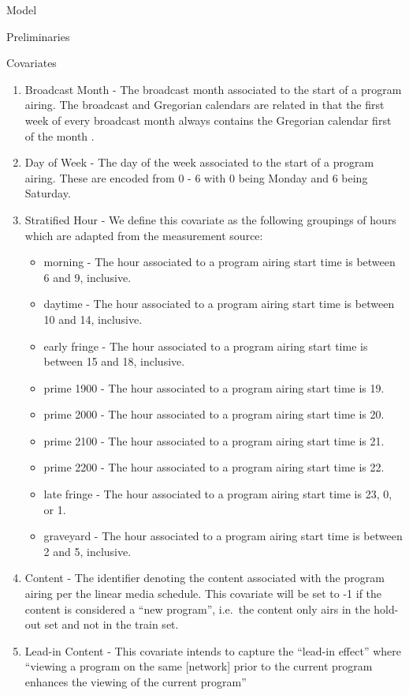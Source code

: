 \begin{chapter}{Model}
\begin{section}{Preliminaries}
\begin{subsection}{Covariates}
    \begin{enumerate}
    \item Broadcast Month - The broadcast month associated to the start of a program airing.
      The broadcast and Gregorian calendars are related in that the first week of every broadcast month always contains the Gregorian calendar first of the month \cite{calendar}.
    \item Day of Week - The day of the week associated to the start of a program airing.
      These are encoded from 0 - 6 with 0 being Monday and 6 being Saturday.
    \item Stratified Hour - We define this covariate as the following groupings of hours which are adapted from the measurement source:
      \begin{itemize}
        \item morning - The hour associated to a program airing start time is between 6 and 9, inclusive.
        \item daytime - The hour associated to a program airing start time is between 10 and 14, inclusive.
        \item early fringe - The hour associated to a program airing start time is between 15 and 18, inclusive.
        \item prime 1900 - The hour associated to a program airing start time is 19.
        \item prime 2000 - The hour associated to a program airing start time is 20.
        \item prime 2100 - The hour associated to a program airing start time is 21.
        \item prime 2200 - The hour associated to a program airing start time is 22.
        \item late fringe - The hour associated to a program airing start time is 23, 0, or 1.
        \item graveyard - The hour associated to a program airing start time is between 2 and 5, inclusive.
      \end{itemize}
    \item Content - The identifier denoting the content associated with the program airing per the linear media schedule.
      This covariate will be set to -1 if the content is considered a ``new program'', i.e.\ the content only airs in
      the hold-out set and not in the train set.
    \item Lead-in Content -
      This covariate intends to capture the ``lead-in effect'' where
      ``viewing a program on the same [network] prior to the current program enhances the viewing of the current program''

\end{enumerate}
\end{subsection}
\end{section}
\end{chapter}
